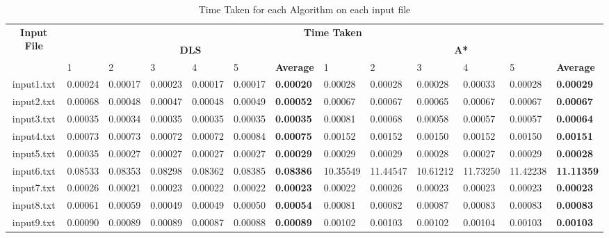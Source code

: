 \documentclass{article}
\begin{document}
	\newpage
	\begin{table}
		\begin{tabular}{|c|c|l|l|l|l|l|l|l|l|l|l|l|}
			\hline
			\multirow{3}{*}{\textbf{Input File}} & \multicolumn{12}{c|}{\textbf{Time Taken}}                                                                   \\ \cline{2-13} 
			& \multicolumn{6}{c|}{\textbf{DLS}}                                        & \multicolumn{6}{c|}{\textbf{A*}} \\ \cline{2-13} 
			& \multicolumn{1}{l|}{1} & 2                         & 3 & 4 & 5 & \textbf{Average} & 1  & 2  & 3  & 4  & 5  & \textbf{Average}  \\ \hline
			input1.txt                           &0.00024 &	0.00017&	0.00023&	0.00017&	0.00017&	\textbf{0.00020}	&0.00028&	0.00028&	0.00028	&0.00033&	0.00028&	\textbf{0.00029 }   \\ \hline
			
			input2.txt                           & 0.00068	& 0.00048	&0.00047&	0.00048&	0.00049	&\textbf{0.00052}&	0.00067&	0.00067&	0.00065	&0.00067&	0.00067&\textbf{	0.00067  }   \\ \hline
			
			input3.txt                           & 0.00035&	0.00034&	0.00035	&0.00035&	0.00035	&\textbf{0.00035}	&0.00081&	0.00068	&0.00058&	0.00057	&0.00057&	\textbf{0.00064     }\\ \hline
			
			input4.txt                           & 0.00073 &	0.00073&	0.00072	&0.00072&	0.00084&	\textbf{0.00075}	&0.00152&	0.00152&	0.00150&	0.00152&	0.00150&\textbf{	0.00151 }   \\ \hline
			
			input5.txt                           & 0.00035 &	0.00027	& 0.00027	&0.00027	& 0.00027	&\textbf{0.00029}	&0.00029	&0.00029	&0.00028	&0.00027& 	0.00029	&\textbf{0.00028 }   \\ \hline
			
			input6.txt                           & 0.08533	&0.08353&	0.08298&	0.08362	&0.08385&	\textbf{0.08386}&	10.35549&	11.44547&	10.61212&	11.73250&	11.42238& 	\textbf{11.11359   }\\ \hline
			
			input7.txt                           & 0.00026	& 0.00021& 	0.00023& 	0.00022	& 0.00022& 	\textbf{0.00023}& 	0.00022& 	0.00026& 	0.00023	& 0.00023	& 0.00023	& \textbf{0.00023   } \\ \hline
			
			input8.txt                           & 0.00061	&0.00059&	0.00049&	0.00049	&0.00050&\textbf{0.00054}	&0.00081&	0.00082	&0.00087&	0.00083	&0.00083&	\textbf{0.00083 }   \\ \hline
			
			input9.txt                           & 0.00090	&0.00089&	0.00089&	0.00087&	0.00088&	\textbf{0.00089}&	0.00102	&0.00103&	0.00102	&0.00104&	0.00103&	\textbf{0.00103 }   \\ \hline
		\end{tabular}
	\caption{Time Taken for each Algorithm on each input file}
	\end{table}
	

	
\end{document}
